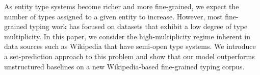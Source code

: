 As entity type systems become richer and more fine-grained, we expect the number of types assigned to a given entity to increase. However, most fine-grained typing work has focused on datasets that exhibit a low degree of type multiplicity. In this paper, we consider the high-multiplicity regime inherent in data sources such as Wikipedia that have semi-open type systems. We introduce a set-prediction approach to this problem and show that our model outperforms unstructured baselines on a new Wikipedia-based fine-grained typing corpus.
